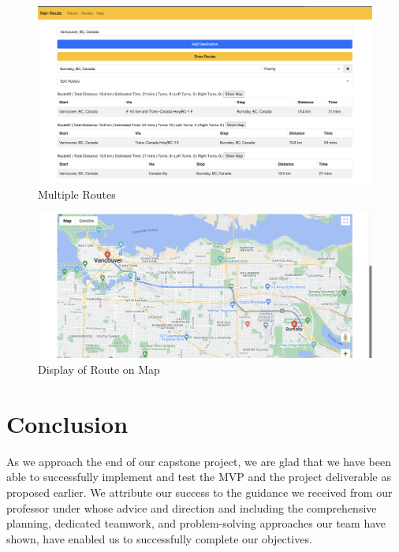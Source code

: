 \documentclass{article}
\begin{document}
\begin{figure}
  \centering
  \includegraphics[width=1\textwidth]{NithishFinal/ARSS2.png}
  \caption{Multiple Routes}
  \label{fig:example}
\end{figure}

\begin{figure}
  \centering
  \includegraphics[width=1\textwidth]{NithishFinal/ARSS3.png}
  \caption{Display of Route on Map}
  \label{fig:example}
\end{figure}


\section{Conclusion}
As we approach the end of our capstone project, we are glad that we have been able to successfully implement and test the MVP and the project deliverable as proposed earlier. We attribute our success to the guidance we received from our professor under whose advice and direction and including the comprehensive planning, dedicated teamwork, and problem-solving approaches our team have shown, have enabled us to successfully complete our objectives.


\end{document}

